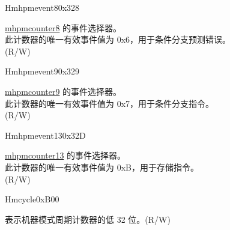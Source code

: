 \begin{register}{H}{mhpmevent8}{0x328}\label{regdesc:MHPMEVENT8}
%
%
\regnewline%
\begin{regdesc}\begin{reglist}
\label{fielddesc:MHPMEVENT8_EVENT}\item [{EVENT[4:0]}] \hyperref[regdesc:MHPMCOUNTER8]{mhpmcounter8} 的事件选择器。\\
此计数器的唯一有效事件值为 0x6，用于条件分支预测错误。\\
(R/W)
\end{reglist}\end{regdesc}
\end{register}

\begin{register}{H}{mhpmevent9}{0x329}\label{regdesc:MHPMEVENT9}
%
%
\regnewline%
\begin{regdesc}\begin{reglist}
\label{fielddesc:MHPMEVENT9_EVENT}\item [{EVENT[4:0]}] \hyperref[regdesc:MHPMCOUNTER9]{mhpmcounter9} 的事件选择器。\\
此计数器的唯一有效事件值为 0x7，用于条件分支指令。\\
(R/W)
\end{reglist}\end{regdesc}
\end{register}

\begin{register}{H}{mhpmevent13}{0x32D}\label{regdesc:MHPMEVENT13}
%
%
\regnewline%
\begin{regdesc}\begin{reglist}
\label{fielddesc:MHPMEVENT13_EVENT}\item [{EVENT[4:0]}] \hyperref[regdesc:MHPMCOUNTER13]{mhpmcounter13} 的事件选择器。\\
此计数器的唯一有效事件值为 0xB，用于存储指令。\\
(R/W)
\end{reglist}\end{regdesc}
\end{register}


\begin{register}{H}{mcycle}{0xB00}\label{regdesc:MCYCLE}
%
\regnewline%
\begin{regdesc}\begin{reglist}
\label{fielddesc:MCYCLE}\item [MCYCLE] 表示机器模式周期计数器的低 32 位。(R/W)
\end{reglist}\end{regdesc}
\end{register}

